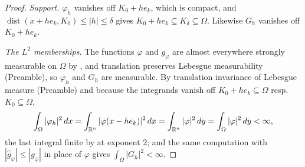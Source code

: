 \begin{proof}
\emph{Support.}  $\varphi_h$ vanishes off $K_0+he_k$, which is compact, and
$\operatorname{dist}(x+he_k,K_0)\le|h|\le\delta$ gives
$K_0+he_k\subseteq K_\delta\subseteq\Omega$.  Likewise $G_h$ vanishes off
$K_0+he_k$.

\emph{The $L^2$ memberships.}  The functions $\varphi$ and $g_\varphi$ are
almost everywhere strongly measurable on $\Omega$ by , and
translation preserves Lebesgue measurability (Preamble), so $\varphi_h$ and
$G_h$ are measurable.  By translation invariance of Lebesgue measure
(Preamble) and because the integrands vanish off $K_0+he_k\subseteq\Omega$ resp.\
$K_0\subseteq\Omega$,
\[
\int_\Omega|\varphi_h|^2\,dx=\int_{\mathbb{R}^n}|\varphi(x-he_k)|^2\,dx
=\int_{\mathbb{R}^n}|\varphi|^2\,dy=\int_\Omega|\varphi|^2\,dy<\infty,
\]
the last integral finite by  at exponent $2$; and the same
computation with $|\widehat g_\varphi|\le|g_\varphi|$ in place of $\varphi$ gives
$\int_\Omega|G_h|^2<\infty$.


\end{proof}
